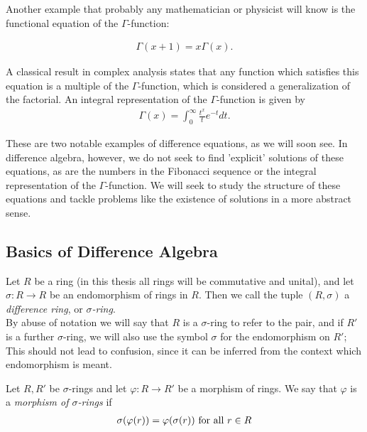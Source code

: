 Another example that probably any mathematician or physicist will know is the functional equation of the $\Gamma$-function:

\begin{align*}
\Gamma(x+1) = x \Gamma(x).
\end{align*}

A classical result in complex analysis states that any function which satisfies this equation is a multiple of the $\Gamma$-function,
which is considered a generalization of the factorial. An integral representation of the $\Gamma$-function is given by
\begin{align*}
\Gamma(x) = \int_0^\infty{\frac{t^x}{t} e^{-t} dt}.
\end{align*}

These are two notable examples of difference equations, as we will soon see. In difference algebra, however, we do not seek to find 'explicit' solutions of these equations,
 as are the numbers in the Fibonacci sequence or the integral representation of the $\Gamma$-function. We will seek to study the structure of these equations and tackle problems like the existence of solutions in a more abstract sense.

\subsection{Basics of Difference Algebra}\label{fundamentos}
\begin{defn}
Let  $R$ be a ring (in this thesis all rings will be commutative and unital), and let
 $\sigma: R \rightarrow R$ be an endomorphism of rings in $R$. Then we call the tuple $(R,\sigma)$ a \emph{difference ring}, or $\sigma$\emph{-ring}.  \\
By abuse of notation we will say that $R$ is a $\sigma$-ring  to refer to the pair, and if $R'$ is a further $\sigma$-ring, we will also use the symbol $\sigma$ for the endomorphism on $R'$; This should not lead to confusion, since it can be inferred from the context which endomorphism is meant. 
\end{defn}

\begin{defn}
Let $R, R'$ be  $\sigma$-rings and let $\varphi: R \rightarrow R'$ be a morphism of rings. We say that $\varphi$ is a \emph{morphism of $\sigma$-rings}  if 
\begin{align*}
\sigma(\varphi(r)) = \varphi(\sigma(r)) \text{ for all } r \in R
\end{align*}
\end{defn}

